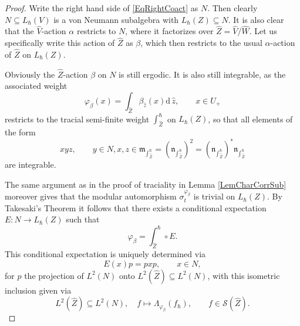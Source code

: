 \documentclass[11pt, reqno]{amsart}
\theoremstyle{definition}
\numberwithin{equation}{section}
\def\Sc{\mathcal S}
\newcommand{\rd}{\mathrm{d}\!\,}
\newcommand{\Nilp}{U}
\newcommand{\mfm}{\mathfrak{m}}
\newcommand{\mfn}{\mathfrak{n}}
\begin{document}
\begin{proof}
Write the right hand side of \eqref{EqRightCoact} as $N$. Then clearly $N \subseteq L_{\hbar}(V)$ is a von Neumann subalgebra with $L_{\hbar}(Z) \subseteq N$. It is also clear that the $\hat{V}$-action $\alpha$ restricts to $N$, where it factorizes over $\hat{Z} = \hat{V}/\hat{W}$. Let us specifically write this action of $\hat{Z}$ as $\beta$, which then restricts to the usual $\alpha$-action of $\hat{Z}$ on $L_{\hbar}(Z)$. 

Obviously the $\hat{Z}$-action $\beta$ on $N$ is still ergodic. It is also still integrable, as the associated weight 
\[
\varphi_{\beta}(x) = \int_{\hat{Z}} \beta_{\hat{z}}(x) \rd \hat{z},\qquad x\in \Nilp_+
\]
restricts to the tracial semi-finite weight $\int_{\hat{Z}}^{\hbar}$ on $L_{\hbar}(Z)$, so that all elements of the form
\[
xyz,\qquad y\in N,x,z\in \mfm_{\int_{\hat{Z}}^{\hbar}} =(\mfn_{\int_{\hat{Z}}^{\hbar}})^2  = (\mfn_{\int_{\hat{Z}}^{\hbar}})^*\mfn_{\int_{\hat{Z}}^{\hbar}}
\]
are integrable. 

The same argument as in the proof of traciality in Lemma \ref{LemCharCorrSub} moreover gives that the modular automorphism $\sigma_t^{\varphi_{\beta}}$ is trivial on $L_{\hbar}(Z)$. By Takesaki's Theorem \cite[Theorem X.4.2]{Tak03} it follows that there exists a conditional expectation $ E\colon  N \rightarrow L_{\hbar}(Z) $ such that 
\[
\varphi_{\beta} = \int_{\hat{Z}}^{\hbar} \circ E.
\]
This conditional expectation is uniquely determined via 
\[
E(x)p = pxp,\qquad x\in N,
\]
for $p$ the projection of $L^2(N)$ onto $L^2(\hat{Z})\subseteq L^2(N)$, with this isometric inclusion given via
\[
L^2(\hat{Z}) \subseteq L^2(N),\quad f\mapsto \Lambda_{\varphi_{\beta}}(f_{\hbar}),\qquad f\in \Sc(\hat{Z}).
\]


\end{proof}
\end{document}
